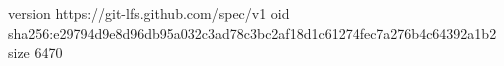 version https://git-lfs.github.com/spec/v1
oid sha256:e29794d9e8d96db95a032c3ad78c3bc2af18d1c61274fec7a276b4c64392a1b2
size 6470
